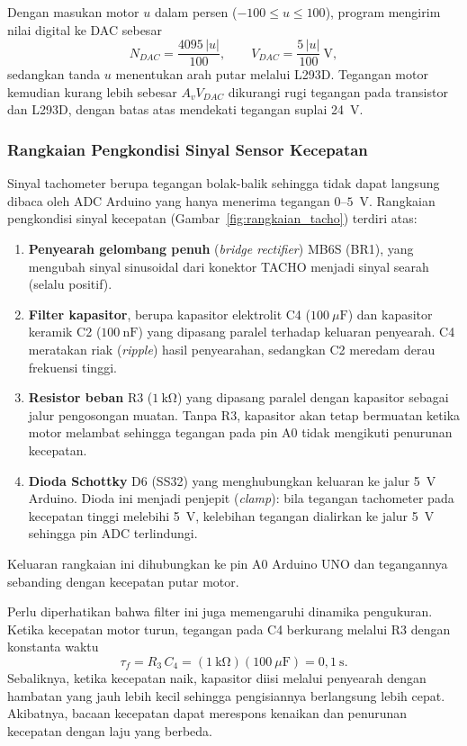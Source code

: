\documentclass[11pt,a4paper]{article}
\begin{document}
Dengan masukan motor $u$ dalam persen ($-100 \le u \le 100$), program mengirim nilai digital ke DAC sebesar
\begin{equation}
	N_{DAC} = \frac{4095\,|u|}{100},
	\qquad
	V_{DAC} = \frac{5\,|u|}{100}~\text{V},
	\label{eq:dac}
\end{equation}
sedangkan tanda $u$ menentukan arah putar melalui L293D. Tegangan motor kemudian kurang lebih sebesar $A_v V_{DAC}$ dikurangi rugi tegangan pada transistor dan L293D, dengan batas atas mendekati tegangan suplai 24~V.

\subsubsection{Rangkaian Pengkondisi Sinyal Sensor Kecepatan}
\label{sec:pengkondisi_kecepatan}
Sinyal tachometer berupa tegangan bolak-balik sehingga tidak dapat langsung dibaca oleh ADC Arduino yang hanya menerima tegangan $0$--$5$~V. Rangkaian pengkondisi sinyal kecepatan (Gambar~\ref{fig:rangkaian_tacho}) terdiri atas:
\begin{enumerate}
	\item \textbf{Penyearah gelombang penuh} (\textit{bridge rectifier}) MB6S (BR1), yang mengubah sinyal sinusoidal dari konektor TACHO menjadi sinyal searah (selalu positif).
	\item \textbf{Filter kapasitor}, berupa kapasitor elektrolit C4 ($100~\mu\mathrm{F}$) dan kapasitor keramik C2 ($100~\mathrm{nF}$) yang dipasang paralel terhadap keluaran penyearah. C4 meratakan riak (\textit{ripple}) hasil penyearahan, sedangkan C2 meredam derau frekuensi tinggi.
	\item \textbf{Resistor beban} R3 ($1~\mathrm{k\Omega}$) yang dipasang paralel dengan kapasitor sebagai jalur pengosongan muatan. Tanpa R3, kapasitor akan tetap bermuatan ketika motor melambat sehingga tegangan pada pin A0 tidak mengikuti penurunan kecepatan.
	\item \textbf{Dioda Schottky} D6 (SS32) yang menghubungkan keluaran ke jalur 5~V Arduino. Dioda ini menjadi penjepit (\textit{clamp}): bila tegangan tachometer pada kecepatan tinggi melebihi 5~V, kelebihan tegangan dialirkan ke jalur 5~V sehingga pin ADC terlindungi.
\end{enumerate}
Keluaran rangkaian ini dihubungkan ke pin A0 Arduino UNO dan tegangannya sebanding dengan kecepatan putar motor.

Perlu diperhatikan bahwa filter ini juga memengaruhi dinamika pengukuran. Ketika kecepatan motor turun, tegangan pada C4 berkurang melalui R3 dengan konstanta waktu
\begin{equation}
	\tau_f = R_3\,C_4 = (1~\mathrm{k\Omega})(100~\mu\mathrm{F}) = 0{,}1~\text{s}.
	\label{eq:tau_filter}
\end{equation}
Sebaliknya, ketika kecepatan naik, kapasitor diisi melalui penyearah dengan hambatan yang jauh lebih kecil sehingga pengisiannya berlangsung lebih cepat. Akibatnya, bacaan kecepatan dapat merespons kenaikan dan penurunan kecepatan dengan laju yang berbeda.
\end{document}
